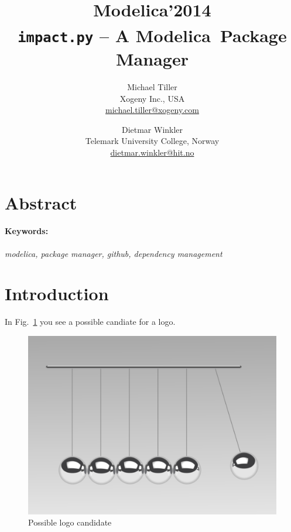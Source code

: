 \documentclass[11pt,a4paper,twocolumn]{article}
\newcommand{\myr}{\textsuperscript{\textregistered}}
\begin{document}
\title{\textbf{{\small Modelica'2014}\\
    \texttt{impact.py} -- A Modelica\myr\ Package Manager}}

\author{Michael Tiller\\Xogeny Inc., USA\\\url{michael.tiller@xogeny.com} %
        \and Dietmar Winkler\\Telemark University College, Norway\\\url{dietmar.winkler@hit.no}}
\date{} %
\maketitle\thispagestyle{empty} %

\section*{Abstract}


\paragraph{Keywords:}\emph{modelica, package manager, github, dependency management}

\section{Introduction}
\label{sec:intro}
In Fig.~\ref{fig:newtons_cradle} you see a possible candiate for a logo.


\begin{figure}[!ht]
  \centering
  \includegraphics[width=\columnwidth]{newtons_cradle}
  \caption{Possible logo candidate \cite{Andersson2007}}
  \label{fig:newtons_cradle}
\end{figure}
\end{document}
